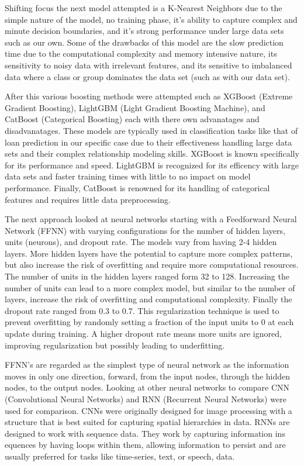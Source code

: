 \documentclass[12pt]{article}
\begin{document}
Shifting focus the next model attempted is a K-Nearest Neighbors due to the simple nature of the model, no training phase, it's ability to capture complex and minute decision boundaries, and it's strong performance under large data sets such as our own. Some of the drawbacks of this model are the slow prediction time due to the computational complexity and memory intensive nature, its sensitivity to noisy data with irrelevant features, and its sensitive to imbalanced data where a class or group dominates the data set (such as with our data set).

After this various boosting methods were attempted such as XGBoost (Extreme Gradient Boosting), LightGBM (Light Gradient Boosting Machine), and CatBoost (Categorical Boosting) each with there own advanatages and disadvanatages. These models are typically used in classification tasks like that of loan prediction in our specific case due to their effectiveness handling large data sets and their complex relationship modeling skills. XGBoost is known specifically for its performance and speed. LightGBM is recognized for its efficency with large data sets and faster training times with little to no impact on model performance. Finally, CatBoost is renowned for its handling of categorical features and requires little data preprocessing.

The next approach looked at neural networks starting with a Feedforward Neural Network (FFNN) with varying configurations for the number of hidden layers, units (neurons), and dropout rate. The models vary from having 2-4 hidden layers. More hidden layers have the potential to capture more complex patterns, but also increase the risk of overfitting and require more computational resources. The number of units in the hidden layers ranged form 32 to 128. Increasing the number of units can lead to a more complex model, but similar to the number of layers, increase the risk of overfitting and computational complexity. Finally the dropout rate ranged from 0.3 to 0.7. This regularization technique is used to prevent overfitting by randomly setting a fraction of the input units to 0 at each update during training. A higher dropout rate means more units are ignored, improving regularization but possibly leading to underfitting.

FFNN's are regarded as the simplest type of neural network as the information moves in only one direction, forward, from the input nodes, through the hidden nodes, to the output nodes. Looking at other neural networks to compare CNN (Convolutional Neural Networks) and RNN (Recurrent Neural Networks) were used for comparison. CNNs were originally designed for image processing with a structure that is best suited for capturing spatial hierarchies in data. RNNs are designed to work with sequence data. They work by capturing information ins equences by having loops within them, allowing information to persist and are usually preferred for tasks like time-series, text, or speech, data.
\end{document}
